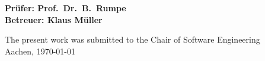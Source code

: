 \begin{titlepage}
\begin{flushleft}
{   {\Large \textbf{Prüfer: Prof.\ Dr.\ B.\ Rumpe}\\}
   \vspace{1em} 
   {\Large \textbf{Betreuer: Klaus Müller}\\}
   \vspace{7em} 

    {\large The present work was submitted to the Chair of Software Engineering \\}
    \vspace{1em}
		{\large	Aachen, \today\\}
  }
  
  
  
\end{flushleft}

\end{titlepage}





